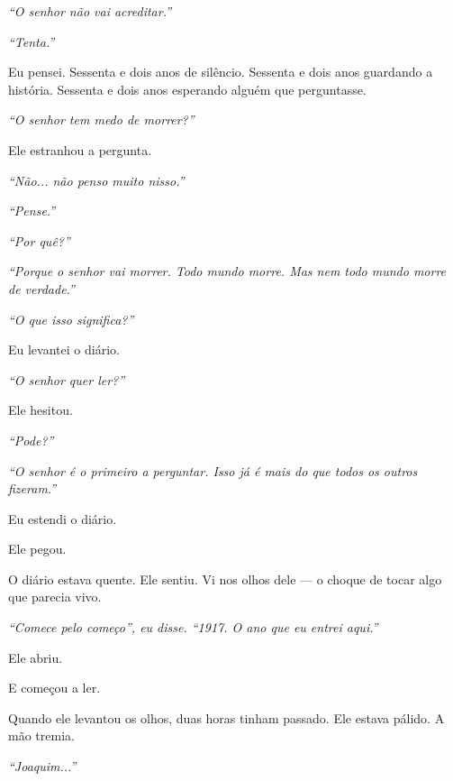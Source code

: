 \noindent \textit{\textquotedblleft{}O senhor não vai acreditar.\textquotedblright{}}

\noindent \textit{\textquotedblleft{}Tenta.\textquotedblright{}}

\noindent Eu pensei. Sessenta e dois anos de silêncio. Sessenta e dois anos guardando a história. Sessenta e dois anos esperando alguém que perguntasse.

\noindent \textit{\textquotedblleft{}O senhor tem medo de morrer?\textquotedblright{}}

\noindent Ele estranhou a pergunta.

\noindent \textit{\textquotedblleft{}Não... não penso muito nisso.\textquotedblright{}}

\noindent \textit{\textquotedblleft{}Pense.\textquotedblright{}}

\noindent \textit{\textquotedblleft{}Por quê?\textquotedblright{}}

\noindent \textit{\textquotedblleft{}Porque o senhor vai morrer. Todo mundo morre. Mas nem todo mundo morre de verdade.\textquotedblright{}}

\noindent \textit{\textquotedblleft{}O que isso significa?\textquotedblright{}}

\noindent Eu levantei o diário.

\noindent \textit{\textquotedblleft{}O senhor quer ler?\textquotedblright{}}

\noindent Ele hesitou.

\noindent \textit{\textquotedblleft{}Pode?\textquotedblright{}}

\noindent \textit{\textquotedblleft{}O senhor é o primeiro a perguntar. Isso já é mais do que todos os outros fizeram.\textquotedblright{}}

\noindent Eu estendi o diário.

\noindent Ele pegou.

\noindent O diário estava quente. Ele sentiu. Vi nos olhos dele --- o choque de tocar algo que parecia vivo.

\noindent \textit{\textquotedblleft{}Comece pelo começo\textquotedblright{}\textit{, eu disse. }\textquotedblleft{}1917. O ano que eu entrei aqui.\textquotedblright{}}

\noindent Ele abriu.

\noindent E começou a ler.

\noindent Quando ele levantou os olhos, duas horas tinham passado. Ele estava pálido. A mão tremia.

\noindent \textit{\textquotedblleft{}Joaquim...\textquotedblright{}}

